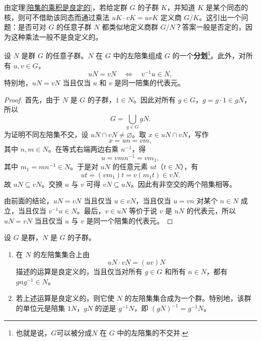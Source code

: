 由定理\ref{陪集的乘积是良定的}，若给定群 $G$ 的子群 $K$，并知道 $K$ 是某个同态的核，则可不借助该同态而通过乘法 $uK\cdot vK=uvK$ 定义商 $G/K$。这引出一个问题：是否可对 $G$ 的任意子群 $N$ 都类似地定义商群 $G/N$？答案一般是否定的，因为这种乘法一般不是良定义的。
\begin{proposition}\label{一般子群的陪集}
	设 $N$ 是群 $G$ 的任意子群。$N$ 在 $G$ 中的左陪集组成 $G$ 的一个\textbf{分划}\footnote{也就是说，$G$可以被分成$N$ 在 $G$ 中的左陪集的不交并.}。此外，对所有 $u,v\in G$，
	\[
	uN=vN\quad\Longleftrightarrow\quad v^{-1}u\in N,
	\]
	特别地，$uN=vN$ 当且仅当 $u$ 和 $v$ 是同一陪集的代表元。
\end{proposition}
\begin{proof}
	首先，由于 $N$ 是 $G$ 的子群，$1\in N$。因此对所有 $g\in G$，$g=g\cdot1\in gN$，所以
	\[
	G=\bigcup_{g\in G} gN.
	\]
	为证明不同左陪集不交，设 $uN\cap vN\neq\varnothing$。取 $x\in uN\cap vN$，写作
	\[
	x=un=vm,
	\]
	其中 $n,m\in N$。在等式右端两边右乘 $n^{-1}$，得
	\[
	u=vmn^{-1}=vm_1,
	\]
	其中 $m_1=mn^{-1}\in N$。于是对 $uN$ 的任意元素 $ut$（$t\in N$），有
	\[
	ut=(vm_1)t=v(m_1t)\in vN.
	\]
	故 $uN\subseteq vN$。交换 $u$ 与 $v$ 可得 $vN\subseteq uN$。因此有非空交的两个陪集相等。
	
	由前面的结论，$uN=vN$ 当且仅当 $u\in vN$，当且仅当 $u=vn$ 对某个 $n\in N$ 成立，当且仅当 $v^{-1}u\in N$。最后，$v\in uN$ 等价于说 $v$ 是 $uN$ 的代表元，所以 $uN=vN$ 当且仅当 $u$ 与 $v$ 是同一个陪集的代表元。
\end{proof}

\begin{proposition}\label{一般子群的陪集成群的充要条件}
	设 $G$ 是群，$N$ 是 $G$ 的子群。
	\begin{enumerate}[label=(\arabic*)]
		\item 在 $N$ 的左陪集集合上由
		\[
		uN\cdot vN=(uv)N
		\]
		描述的运算是良定义的，当且仅当对所有 $g\in G$ 和所有 $n\in N$，都有 $gng^{-1}\in N$。
		\item 若上述运算是良定义的，则它使 $N$ 的左陪集集合成为一个群。特别地，该群的单位元是陪集 $1N$，$gN$ 的逆是 $g^{-1}N$，即 $(gN)^{-1}=g^{-1}N$。
	\end{enumerate}
\end{proposition}

